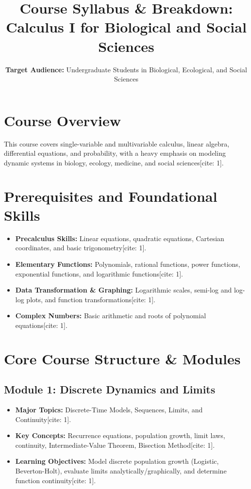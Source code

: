 \documentclass[10pt, letterpaper]{article}
\title{\textbf{Course Syllabus \& Breakdown: Calculus I for Biological and Social Sciences}}
\author{\textbf{Target Audience:} Undergraduate Students in Biological, Ecological, and Social Sciences}
\date{}
\begin{document}
\maketitle

\section{Course Overview}
This course covers single-variable and multivariable calculus, linear algebra, differential equations, and probability, with a heavy emphasis on modeling dynamic systems in biology, ecology, medicine, and social sciences[cite: 1].

\section{Prerequisites and Foundational Skills}
\begin{itemize}[leftmargin=*]
    \item \textbf{Precalculus Skills:} Linear equations, quadratic equations, Cartesian coordinates, and basic trigonometry[cite: 1].
    \item \textbf{Elementary Functions:} Polynomials, rational functions, power functions, exponential functions, and logarithmic functions[cite: 1].
    \item \textbf{Data Transformation \& Graphing:} Logarithmic scales, semi-log and log-log plots, and function transformations[cite: 1].
    \item \textbf{Complex Numbers:} Basic arithmetic and roots of polynomial equations[cite: 1].
\end{itemize}

\section{Core Course Structure \& Modules}

\subsection{Module 1: Discrete Dynamics and Limits}
\begin{itemize}[leftmargin=*]
    \item \textbf{Major Topics:} Discrete-Time Models, Sequences, Limits, and Continuity[cite: 1].
    \item \textbf{Key Concepts:} Recurrence equations, population growth, limit laws, continuity, Intermediate-Value Theorem, Bisection Method[cite: 1].
    \item \textbf{Learning Objectives:} Model discrete population growth (Logistic, Beverton-Holt), evaluate limits analytically/graphically, and determine function continuity[cite: 1].
\end{itemize}
\end{document}

